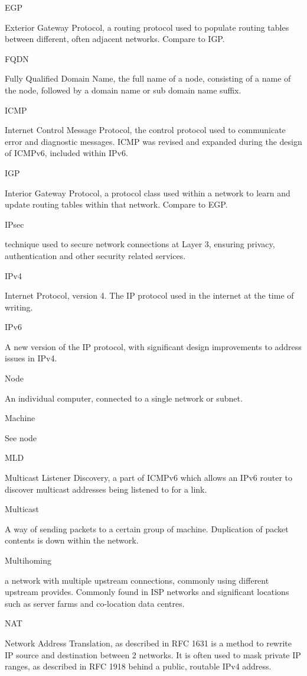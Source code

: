 EGP

Exterior Gateway Protocol, a routing protocol used to populate routing
tables between different, often adjacent networks. Compare to IGP.

FQDN

Fully Qualified Domain Name, the full name of a node, consisting of a
name of the node, followed by a domain name or sub domain name suffix.

ICMP

Internet Control Message Protocol, the control protocol used to
communicate error and diagnostic messages. ICMP was revised and expanded 
during the design of ICMPv6, included within IPv6.

IGP

Interior Gateway Protocol, a protocol class used within a network to
learn and update routing tables within that network. Compare to EGP.

IPsec

technique used to secure network connections at Layer 3, ensuring
privacy, authentication and other security related services. 

IPv4

Internet Protocol, version 4. The IP protocol used in the internet
at the time of writing.

IPv6

A new version of the IP protocol, with significant design improvements
to address issues in IPv4.

Node

An individual computer, connected to a single network or subnet.

Machine

See node

MLD

Multicast Listener Discovery, a part of ICMPv6 which allows an IPv6
router to discover multicast addresses being listened to for a link.

Multicast

A way of sending packets to a certain group of machine. Duplication of
packet contents is down within the network.

Multihoming

a network with multiple upstream connections, commonly using different
upstream provides. Commonly found in ISP networks and significant
locations such as server farms and co-location data centres.

NAT

Network Address Translation, as described in RFC 1631 is a method
to rewrite IP source and destination between 2 networks. It is often
used to mask private IP ranges, as described in RFC 1918 behind a 
public, routable IPv4 address. 

